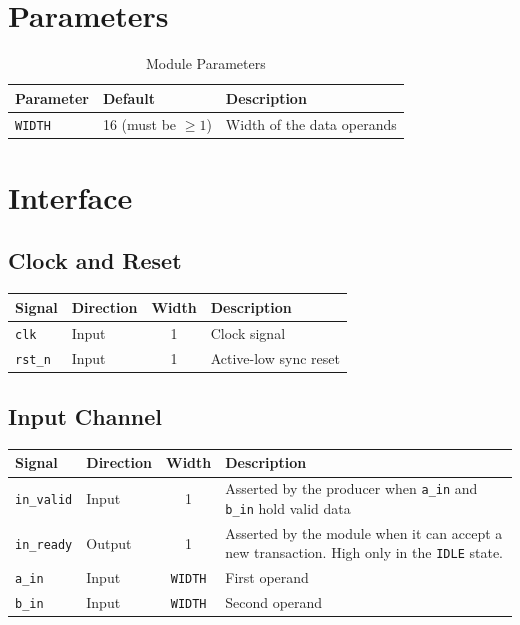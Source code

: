 \section{Parameters}
\begin{table}[H]
    \centering
    \begin{tabular}{llp{8cm}}
        \toprule
        \textbf{Parameter} & \textbf{Default} & \textbf{Description} \\
        \midrule
        \texttt{WIDTH} & 16 (must be $\geq 1$) & Width of the data operands \\
        \bottomrule
    \end{tabular}
    \caption{Module Parameters}
\end{table}

\section{Interface}

\subsection*{Clock and Reset}
\begin{table}[H]
    \centering
    \begin{tabularx}{\textwidth}{l l c X}
        \toprule
        \textbf{Signal} & \textbf{Direction} & \textbf{Width} & \textbf{Description} \\
        \midrule
        \texttt{clk} & Input & 1 & Clock signal \\
        \texttt{rst\_n} & Input & 1 & Active-low sync reset \\
        \bottomrule
    \end{tabularx}
\end{table}

\subsection*{Input Channel}
\begin{table}[H]
    \centering
    \begin{tabularx}{\textwidth}{l l c X}
        \toprule
        \textbf{Signal} & \textbf{Direction} & \textbf{Width} & \textbf{Description} \\
        \midrule
        \texttt{in\_valid} & Input & 1 & Asserted by the producer when \texttt{a\_in} and \texttt{b\_in} hold valid data \\
        \texttt{in\_ready} & Output & 1 & Asserted by the module when it can accept a new transaction. High only in the \texttt{IDLE} state. \\
        \texttt{a\_in} & Input & \texttt{WIDTH} & First operand \\
        \texttt{b\_in} & Input & \texttt{WIDTH} & Second operand \\
        \bottomrule
    \end{tabularx}
\end{table}

